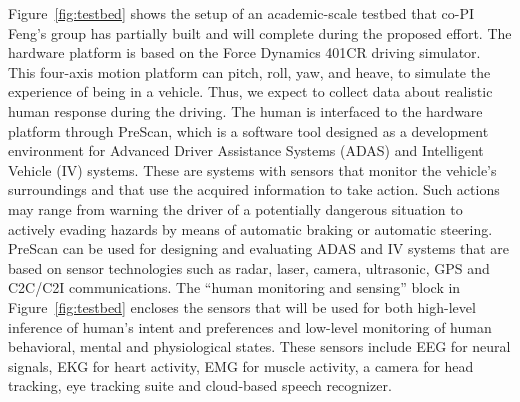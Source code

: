 Figure~\ref{fig:testbed} shows the setup of an academic-scale testbed that co-PI Feng's group has partially built and will complete during the proposed effort. The hardware platform is based on the Force Dynamics 401CR driving simulator. This four-axis motion platform can pitch, roll, yaw, and heave, to simulate the experience of being in a vehicle. Thus, we expect to collect data about realistic human response during the driving. The human is interfaced to the hardware platform through PreScan, which is a software tool designed as a development environment for Advanced Driver Assistance Systems (ADAS) and Intelligent Vehicle (IV) systems. These are systems with sensors that monitor the vehicle's surroundings and that use the acquired information to take action. Such actions may range from warning the driver of a potentially dangerous situation to actively evading hazards by means of automatic braking or automatic steering. PreScan can be used for designing and evaluating ADAS and IV systems that are based on sensor technologies such as radar, laser, camera, ultrasonic, GPS and C2C/C2I communications. 
The ``human monitoring and sensing'' block in Figure~\ref{fig:testbed} encloses the sensors that will be used for both high-level inference of human's intent and preferences and low-level monitoring of human behavioral, mental and physiological states. These sensors include EEG for neural signals, EKG for heart activity, EMG for muscle activity, a camera for head tracking, eye tracking suite and cloud-based speech recognizer.


